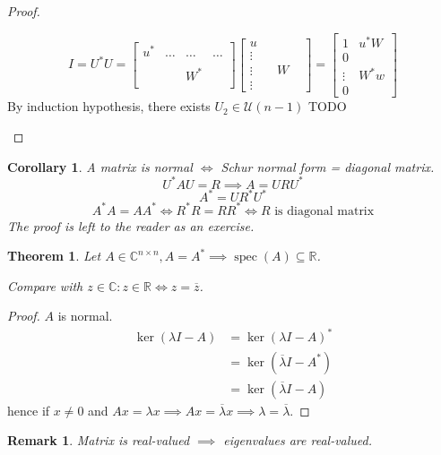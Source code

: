 \documentclass{article}
\newtheorem{theorem}{Theorem}  \numberwithin{theorem}{section}
\newtheorem{remark}{Remark}  \numberwithin{remark}{section}
\newtheorem*{corollary}{Corollary}%
\begin{document}
\begin{proof}
\begin{description}
      \[ I = U^* U = \begin{bmatrix} u^* & \dots & \dots & \dots \\ & & & \\ & & W^* & \\ & & & \end{bmatrix} \begin{bmatrix} u & & & \\ \vdots & & & \\ \vdots & & W & \\ \vdots & & & \end{bmatrix} = \begin{bmatrix} 1 & u^* W \\ 0 & \\ \vdots & W^* w \\ 0 & \end{bmatrix} \]
      By induction hypothesis, there exists $U_2 \in \mathcal U(n-1)$ TODO
  \end{description}
\end{proof}

\begin{corollary}
  A matrix is normal $\iff$ Schur normal form = diagonal matrix.
  \[ U^* AU = R \implies A = URU^* \]
  \[ A^* = UR^* U^* \]
  \[ A^* A = AA^* \iff R^* R = RR^* \iff R \text{ is diagonal matrix} \]
  The proof is left to the reader as an exercise.
\end{corollary}

\begin{theorem} %
  Let $A \in \mathbb C^{n \times n}, A = A^* \implies \operatorname{spec}(A) \subseteq \mathbb R$.

  Compare with $z \in \mathbb C: z \in \mathbb R \iff z = \overline{z}$.
\end{theorem}

\begin{proof}
  $A$ is normal.
  \begin{align*}
    \ker(\lambda I - A) &= \ker(\lambda I - A)^* \\
      &= \ker(\overline{\lambda} I - A^*) \\
      &= \ker(\overline{\lambda} I - A)
  \end{align*}
  hence if $x \neq 0$ and $Ax = \lambda x \implies Ax = \overline{\lambda} x \implies \lambda = \overline\lambda$.
\end{proof}

\begin{remark}
  Matrix is real-valued $\implies$ eigenvalues are real-valued.
\end{remark}
\end{document}
